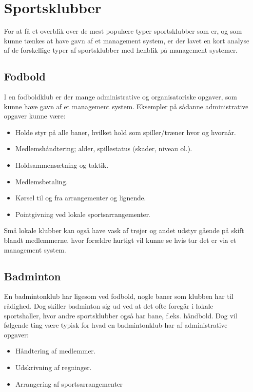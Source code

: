 \chapter{Sportsklubber}
For at få et overblik over de mest populære typer sportsklubber som er, og som kunne tænkes at have gavn af et management system, er der lavet en kort analyse af de forskellige typer af sportsklubber med henblik på management systemer. 
\section{Fodbold}
I en fodboldklub er der mange administrative og organisatoriske opgaver, som kunne have gavn af et management system. Eksempler på sådanne administrative opgaver kunne være:
\begin{itemize}
\item Holde styr på alle baner, hvilket hold som spiller/træner hvor og hvornår.
\item Medlemshåndtering; alder, spillestatus (skader, niveau ol.).
\item Holdsammensætning og taktik.
\item Medlemsbetaling.
\item Kørsel til og fra arrangementer og lignende.
\item Pointgivning ved lokale sportsarrangementer.
\end{itemize}
Små lokale klubber kan også have vask af trøjer og andet udstyr gående på skift blandt medlemmerne, hvor forældre hurtigt vil kunne se hvis tur det er via et management system. 

\section{Badminton}
En badmintonklub har ligesom ved fodbold, nogle baner som klubben har til rådighed. Dog skiller badminton sig ud ved at det ofte foregår i lokale sportshaller, hvor andre sportsklubber også har bane, f.eks. håndbold. Dog vil følgende ting være typisk for hvad en badmintonklub har af administrative opgaver:
\begin{itemize}
\item Håndtering af medlemmer.
\item Udskrivning af regninger.
\item Arrangering af sportsarrangementer
\end{itemize}

